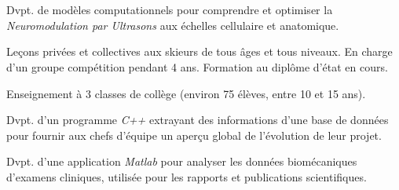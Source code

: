 \documentclass[a4paper]{cv}
\begin{document}
\begin{center}
\\
\vspace{5pt}
\\
\details
\end{center}
\begin{minipage}[t]{0.6\textwidth}

\experience

Dvpt. de modèles computationnels pour comprendre et optimiser la \emph{Neuromodulation par Ultrasons} aux échelles cellulaire et anatomique.
\sectionspace

Leçons privées et collectives aux skieurs de tous âges et tous niveaux. En charge d'un groupe compétition pendant 4 ans. Formation au diplôme d’état en cours.
\sectionspace

Enseignement à 3 classes de collège (environ 75 élèves, entre 10 et 15 ans).
\sectionspace

Dvpt. d'un programme \emph{C++} extrayant des informations d'une base de données pour fournir aux chefs d’équipe un aperçu global de l'évolution de leur projet.
\sectionspace

Dvpt. d'une application \emph{Matlab} pour analyser les données biomécaniques d’examens cliniques, utilisée pour les rapports et publications scientifiques.
\sectionspace


\end{minipage}
\end{document}

